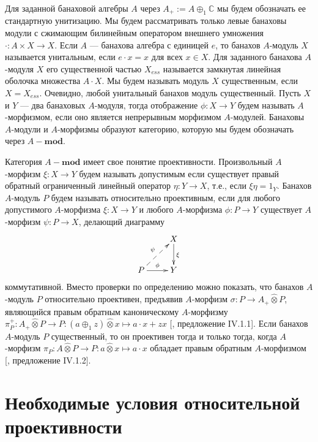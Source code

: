 \documentclass[12pt]{article}
\numberwithin{equation}{subsection}
\theoremstyle{plain}
\newcommand{\projtens}{\mathbin{\widehat{\otimes}}}
\begin{document}
\begin{fulltext}
    Для заданной банаховой алгебры $A$ через $A_+:=A\oplus_1 \mathbb{C}$ мы
    будем обозначать ее стандартную унитизацию. Мы будем рассматривать только
    левые банаховы модули с сжимающим билинейным оператором внешнего умножения
    $\cdot:A\times X\to X$. Если $A$ --- банахова алгебра с единицей $e$, то
    банахов $A$-модуль $X$ называется унитальным, если $e\cdot x=x$ для всех
    $x\in X$. Для заданного банахова $A$-модуля $X$ его существенной частью
    $X_{ess}$ называется замкнутая линейная оболочка множества $A\cdot X$. Мы
    будем называть модуль $X$ существенным, если $X=X_{ess}$. Очевидно, любой
    унитальный банахов модуль существенный. Пусть $X$ и $Y$ --- два банаховых
    $A$-модуля, тогда отображение $\phi:X\to Y$ будем называть $A$-морфизмом,
    если оно является непрерывным морфизмом $A$-модулей. Банаховы $A$-модули и
    $A$-морфизмы образуют категорию, которую мы будем обозначать через
    $A-\mathbf{mod}$.

    Категория $A-\mathbf{mod}$ имеет свое понятие проективности. Произвольный
    $A$-мор\-физм $\xi:X\to Y$ будем называть допустимым если существует правый
    обратный ограниченный линейный оператор $\eta:Y\to X$, т.е., если
    $\xi\eta=1_Y$. Банахов $A$-модуль $P$ будем называть относительно
    проективным, если для любого допустимого $A$-морфизма $\xi:X\to Y$ и любого
    $A$-морфизма $\phi:P\to Y$ существует $A$-морфизм $\psi:P\to X$, делающий
    диаграмму
    $$
        \xymatrix{
        & {X} \ar[d]^{\xi}\\  %
        {P} \ar@{-->}[ur]^{\psi} \ar[r]^{\phi} &{Y}}  %
    $$
    коммутативной. Вместо проверки по определению можно показать, что банахов
    $A$-модуль $P$ относительно проективен, предъявив $A$-морфизм $\sigma:P\to
        A_+\projtens P$, являющийся правым обратным каноническому $A$-морфизму
    $\pi_P^+:A_+\projtens P\to P:(a\oplus_1 z)\projtens x\mapsto a\cdot x+z x$
    [\cite{HelHomolBanTopAlg}, предложение IV.1.1]. Если банахов $A$-модуль $P$
    существенный, то он проективен тогда и только тогда, когда $A$-морфизм
    $\pi_P:A\projtens P\to P: a\projtens x\mapsto a\cdot x$ обладает правым
    обратным $A$-морфизмом [\cite{HelHomolBanTopAlg}, предложение IV.1.2].


    \section{Необходимые условия относительной
      проективности}\label{NecessaryConditions}


\end{fulltext}
\end{document}
